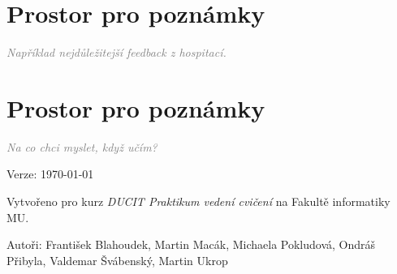 \documentclass[twoside,openany,10pt]{book}
\newcommand{\note}[1]{\textcolor{gray}{\small\itshape #1}}
\begin{document}
\chapter*{Prostor pro poznámky}
\note{Například nejdůležitejší feedback z hospitací.}

\chapter*{Prostor pro poznámky}
\note{Na co chci myslet, když učím?}

\newpage
\vspace*{\fill}
Verze: \today

Vytvořeno pro kurz \textit{DUCIT Praktikum vedení cvičení} na Fakultě informatiky MU.

Autoři: František Blahoudek, Martin Macák, Michaela Pokludová, Ondráš Přibyla, Valdemar Švábenský, Martin Ukrop
\end{document}
